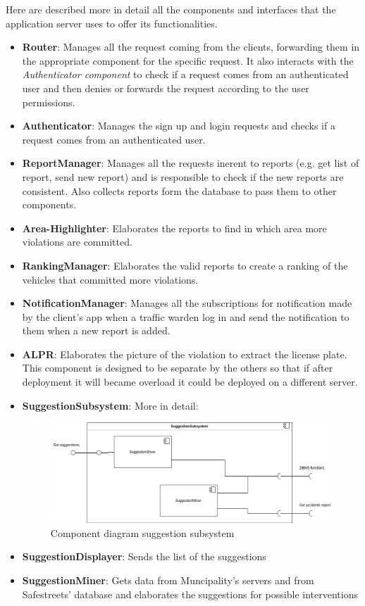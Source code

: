 \documentclass{article}
\begin{document}
Here are described more in detail all the components and interfaces that
the application server uses to offer its functionalities.
\begin{itemize}
	\item \textbf{Router}: Manages all the request coming from the clients, forwarding them in the appropriate component for the specific request. 
	It also interacts with the \textit{Authenticator component} to check if a request comes from an authenticated user and then denies or forwards the request according to the user permissions.
	\item \textbf{Authenticator}: Manages the sign up and login requests and checks if a request comes from an authenticated user.
	\item \textbf{ReportManager}: Manages all the requests inerent to reports (e.g. get list of report, send new report) and is responsible to check if the new reports are consistent. Also collects reports form the database to pass them to other components.
	\item \textbf{Area-Highlighter}: Elaborates the reports to find in which area more violations are committed.
	\item \textbf{RankingManager}: Elaborates the valid reports to create a ranking of the vehicles that committed more violations.
	\item \textbf{NotificationManager}: Manages all the subscriptions for notification made by the client's app when a traffic warden log in and send the notification to them when a new report is added.
	\item \textbf{ALPR}: Elaborates the picture of the violation to extract the license plate. This component is designed to be separate by the others so that if after deployment it will became overload it could be deployed on a different server.
	\item \textbf{SuggestionSubsystem}: More in detail:
		\\
\begin{figure}[ht]
\centering
	\includegraphics[width=1.0\textwidth]{images/SuggestionSubsystem-components-diagram.png}
	\caption{Component diagram suggestion subsystem}
	\label{fig:component-suggestion-subsystem}
\end{figure}
	\item \textbf{SuggestionDisplayer}: Sends the list of the suggestions
	\item \textbf{SuggestionMiner}: Gets data from Muncipality's servers and from Safestreets' database and elaborates the suggestions for possible interventions
\end{itemize}
\end{document}
